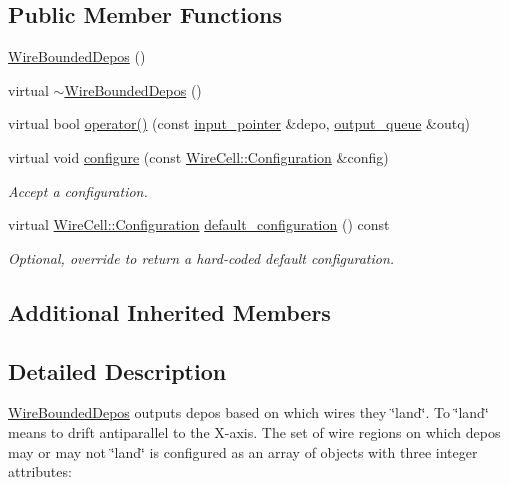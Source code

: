 \subsection*{Public Member Functions}
\begin{DoxyCompactItemize}
\item 
\hyperlink{class_wire_cell_1_1_gen_1_1_wire_bounded_depos_a737d91f9772dc3b8fd4d443664daf40f}{Wire\+Bounded\+Depos} ()
\item 
virtual \hyperlink{class_wire_cell_1_1_gen_1_1_wire_bounded_depos_a8c9ce3b8edf35e3a814501cb83d8051d}{$\sim$\+Wire\+Bounded\+Depos} ()
\item 
virtual bool \hyperlink{class_wire_cell_1_1_gen_1_1_wire_bounded_depos_a510fe7ba6ae980b5ab232dedac572c7d}{operator()} (const \hyperlink{class_wire_cell_1_1_i_queuedout_node_acf5f716a764553f3c7055a9cf67e906e}{input\+\_\+pointer} \&depo, \hyperlink{class_wire_cell_1_1_i_queuedout_node_a39018e4e3dd886befac9636ac791a685}{output\+\_\+queue} \&outq)
\item 
virtual void \hyperlink{class_wire_cell_1_1_gen_1_1_wire_bounded_depos_a8a5d8c2f944879a83ae1bd663c615e03}{configure} (const \hyperlink{namespace_wire_cell_a9f705541fc1d46c608b3d32c182333ee}{Wire\+Cell\+::\+Configuration} \&config)
\begin{DoxyCompactList}\small\item\em Accept a configuration. \end{DoxyCompactList}\item 
virtual \hyperlink{namespace_wire_cell_a9f705541fc1d46c608b3d32c182333ee}{Wire\+Cell\+::\+Configuration} \hyperlink{class_wire_cell_1_1_gen_1_1_wire_bounded_depos_a310a7a83ec08bbe1efb5543bff582ae7}{default\+\_\+configuration} () const
\begin{DoxyCompactList}\small\item\em Optional, override to return a hard-\/coded default configuration. \end{DoxyCompactList}\end{DoxyCompactItemize}
\subsection*{Additional Inherited Members}


\subsection{Detailed Description}
\hyperlink{class_wire_cell_1_1_gen_1_1_wire_bounded_depos}{Wire\+Bounded\+Depos} outputs depos based on which wires they \char`\"{}land\char`\"{}. To \char`\"{}land\char`\"{} means to drift antiparallel to the X-\/axis. The set of wire regions on which depos may or may not \char`\"{}land\char`\"{} is configured as an array of objects with three integer attributes\+:

